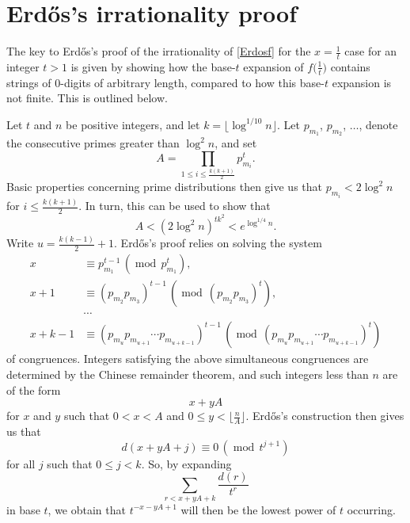 \documentclass[12pt]{article}
\begin{document}
\section{Erd\H{o}s's irrationality proof}\label{secErdos}
 The key to Erd\H{o}s's proof \cite{Erdos1948} of the irrationality of \eqref{Erdosf} for the $x = \frac{1}{t}$ case for an integer $t > 1$ is 
 given by showing how the base-$t$ expansion of $f\big( \frac{1}{t} \big)$ contains strings of $0$-digits of arbitrary length, compared to 
 how this base-$t$ expansion is not finite. This is outlined below. 

 Let $t$ and $n$ be positive integers, and let $k = \big\lfloor \log^{1/10} n \big\rfloor$. Let $ p_{m_1}$, $p_{m_{2}}$, $\ldots$, 
 denote the consecutive 
 primes greater than $\log^2 n$, and set 
 $$ A = \prod_{1 \leq i \leq \frac{k(k+1)}{2}} p_{m_{i}}^{t}. $$
 Basic properties concerning prime distributions then give us that 
 $p_{m_i} < 2 \log^2 n$ for $ i \leq \frac{k(k+1)}{2}$. In turn, this can be used to show 
 that 
 $$ A < \left( 2 \log^2 n \right)^{t k^2} < e^{\log^{1/4} n}. $$
 Write $u = \frac{k(k-1)}{2} + 1$. 
 Erd\H{o}s's proof relies on solving the system 
\begin{align*}
 x & \equiv p_{m_{1}}^{t-1} \, \left(\operatorname{mod} \, p_{m_{1}}^{t} \right), \\ 
 x + 1 & \equiv \left( p_{m_{2}} p_{m_{3}} \right)^{t-1} \, \left(\operatorname{mod} \, \left( p_{m_{2}} p_{m_{3}} \right)^{t} 
 \right), \\ 
 & \cdots \\ 
 x + k - 1 & \equiv \left( p_{m_{u}} p_{m_{u+1}} \cdots p_{m_{u + k -1}} \right)^{t-1}
 \, \left(\operatorname{mod} \, \left( p_{m_u} p_{m_{u+1}} 
 \cdots p_{m_{u+k-1}} \right)^{t} \right) 
\end{align*}
 of congruences. 	 Integers satisfying the above simultaneous congruences are determined by the Chinese remainder theorem, and such 
 integers less than $n$ are of the form $$ x + y A $$ for $x$ and $y$ such that $0 < x < A$ and $0 \leq y < \big\lfloor \frac{n}{A} 
 \big\rfloor$. Erd\H{o}s's construction then gives us that 
 $$ d\left( x + y A + j \right) \equiv 0 \, \left(\operatorname{mod} \, t^{j+1} \right) $$
 for all $j$ such that $0 \leq j < k$. So, by expanding 
\begin{equation}\label{expandt}
 \sum_{r < x + y A + k} \frac{d(r)}{t^r} 
\end{equation}
 in base $t$, we obtain that $t^{-x-yA +1}$ will then be the lowest
 power of $t$ occurring. 
\end{document}
